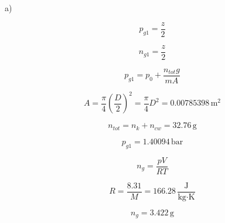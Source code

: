 a)

\[
p_{g1} = \frac{z}{2}
\]

\[
n_{g1} = \frac{z}{2}
\]

\[
p_{g1} = p_0 + \frac{n_{tot} g}{m A}
\]

\[
A = \frac{\pi}{4} \left( \frac{D}{2} \right)^2 = \frac{\pi}{4} D^2 = 0.00785398 \, \text{m}^2
\]

\[
n_{tot} = n_{k} + n_{cw} = 32.76 \, \text{g}
\]

\[
p_{g1} = 1.40094 \, \text{bar}
\]

\[
n_{g} = \frac{p V}{R T}
\]

\[
R = \frac{8.31}{M} = 166.28 \, \frac{\text{J}}{\text{kg} \cdot \text{K}}
\]

\[
n_{g} = 3.422 \, \text{g}
\]